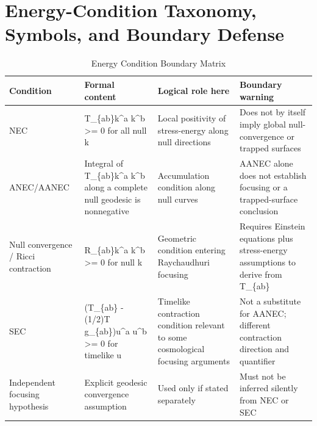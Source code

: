 \documentclass[conference]{IEEEtran}
\begin{document}
\appendices
\section{Energy-Condition Taxonomy, Symbols, and Boundary Defense}
\begin{table}[htbp]
\centering
\footnotesize
\setlength{\tabcolsep}{3pt}
\renewcommand{\arraystretch}{1.12}
\caption{Energy Condition Boundary Matrix}
\label{tab:appendix-variables-and-definitions-b1}
\begin{tabular}{|p{}|p{}|p{}|p{}|}
\hline
Condition & Formal content & Logical role here & Boundary warning \\\hline
NEC & T\_\{ab\}k\textasciicircum{}a k\textasciicircum{}b >= 0 for all null k & Local positivity of stress-energy along null directions & Does not by itself imply global null-convergence or trapped surfaces \\\hline
ANEC/AANEC & Integral of T\_\{ab\}k\textasciicircum{}a k\textasciicircum{}b along a complete null geodesic is nonnegative & Accumulation condition along null curves & AANEC alone does not establish focusing or a trapped-surface conclusion \\\hline
Null convergence / Ricci contraction & R\_\{ab\}k\textasciicircum{}a k\textasciicircum{}b >= 0 for null k & Geometric condition entering Raychaudhuri focusing & Requires Einstein equations plus stress-energy assumptions to derive from T\_\{ab\} \\\hline
SEC & (T\_\{ab\} - (1/2)T g\_\{ab\})u\textasciicircum{}a u\textasciicircum{}b >= 0 for timelike u & Timelike contraction condition relevant to some cosmological focusing arguments & Not a substitute for AANEC; different contraction direction and quantifier \\\hline
Independent focusing hypothesis & Explicit geodesic convergence assumption & Used only if stated separately & Must not be inferred silently from NEC or SEC \\\hline
\end{tabular}
\end{table}~\cite{cite_37ecbded9d629353}
\end{document}

